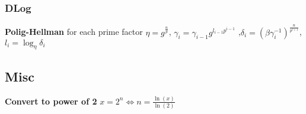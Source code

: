 \documentclass[twoside, 11pt]{article}
\begin{document}
            \subsubsection*{DLog}
                \textbf{Polig-Hellman} for each prime factor $\eta = g^{\frac{n}{p}}$, $\gamma_{i}=\gamma_{i-1}g^{l_{i-1}p^{i-1}}$ ,$\delta_{i}=(\beta\gamma_{i}^{-1})^{\frac{n}{p^{i+1}}}$, $l_{i}=\log_{\eta}\delta_{i}$

        \subsection*{Misc}
            \textbf{Convert to power of 2} $x = 2^{n} \Leftrightarrow n = \frac{\ln(x)}{\ln(2)}$ \\
\end{document}
